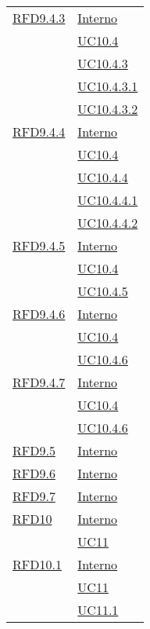 \begin{longtable}{|>{\centering}m{5cm}|m{5cm}<{\centering}|}
\hyperlink{RFD9.4.3}{RFD9.4.3} & \hyperlink{Interno}{Interno}\\
& \hyperref[UC10.4]{UC10.4}\\
& \hyperref[UC10.4.3]{UC10.4.3}\\
& \hyperref[UC10.4.3.1]{UC10.4.3.1}\\
& \hyperref[UC10.4.3.2]{UC10.4.3.2}\\ \hline

\hyperlink{RFD9.4.4}{RFD9.4.4} & \hyperlink{Interno}{Interno}\\
& \hyperref[UC10.4]{UC10.4}\\
& \hyperref[UC10.4.4]{UC10.4.4}\\
& \hyperref[UC10.4.4.1]{UC10.4.4.1}\\
& \hyperref[UC10.4.4.2]{UC10.4.4.2}\\ \hline

\hyperlink{RFD9.4.5}{RFD9.4.5} & \hyperlink{Interno}{Interno}\\
& \hyperref[UC10.4]{UC10.4}\\
& \hyperref[UC10.4.5]{UC10.4.5}\\ \hline

\hyperlink{RFD9.4.6}{RFD9.4.6} & \hyperlink{Interno}{Interno}\\
& \hyperref[UC10.4]{UC10.4}\\
& \hyperref[UC10.4.6]{UC10.4.6}\\ \hline

\hyperlink{RFD9.4.7}{RFD9.4.7} & \hyperlink{Interno}{Interno}\\
& \hyperref[UC10.4]{UC10.4}\\
& \hyperref[UC10.4.6]{UC10.4.6}\\ \hline

\hyperlink{RFD9.5}{RFD9.5} & \hyperlink{Interno}{Interno}\\ \hline

\hyperlink{RFD9.6}{RFD9.6} & \hyperlink{Interno}{Interno}\\ \hline

\hyperlink{RFD9.7}{RFD9.7} & \hyperlink{Interno}{Interno}\\ \hline

\hyperlink{RFD10}{RFD10} & \hyperlink{Interno}{Interno}\\
& \hyperref[UC11]{UC11}\\ \hline

\hyperlink{RFD10.1}{RFD10.1} & \hyperlink{Interno}{Interno}\\
& \hyperref[UC11]{UC11}\\
& \hyperref[UC11.1]{UC11.1}\\ \hline


\end{longtable}
